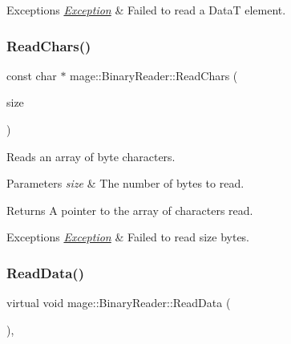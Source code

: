 \begin{DoxyExceptions}{Exceptions}
{\em \hyperlink{classmage_1_1_exception}{Exception}} & Failed to read a {\ttfamily DataT} element. \\
\hline
\end{DoxyExceptions}
\hypertarget{classmage_1_1_binary_reader_af1e0e4ab815e23c72ab65fd7c0748d3f}{}\label{classmage_1_1_binary_reader_af1e0e4ab815e23c72ab65fd7c0748d3f} 
\subsubsection{\texorpdfstring{Read\+Chars()}{ReadChars()}}
{\footnotesize\ttfamily const char $\ast$ mage\+::\+Binary\+Reader\+::\+Read\+Chars (\begin{DoxyParamCaption}\item[{size\+\_\+t}]{size }\end{DoxyParamCaption})\hspace{0.3cm}{\ttfamily [protected]}}

Reads an array of byte characters.


\begin{DoxyParams}{Parameters}
{\em size} & The number of bytes to read. \\
\hline
\end{DoxyParams}
\begin{DoxyReturn}{Returns}
A pointer to the array of characters read. 
\end{DoxyReturn}

\begin{DoxyExceptions}{Exceptions}
{\em \hyperlink{classmage_1_1_exception}{Exception}} & Failed to read {\ttfamily size} bytes. \\
\hline
\end{DoxyExceptions}
\hypertarget{classmage_1_1_binary_reader_a67157828a9781644fb55bd7f3558f07c}{}\label{classmage_1_1_binary_reader_a67157828a9781644fb55bd7f3558f07c} 
\subsubsection{\texorpdfstring{Read\+Data()}{ReadData()}}
{\footnotesize\ttfamily virtual void mage\+::\+Binary\+Reader\+::\+Read\+Data (\begin{DoxyParamCaption}{ }\end{DoxyParamCaption})\hspace{0.3cm}{\ttfamily [private]}, {}}

